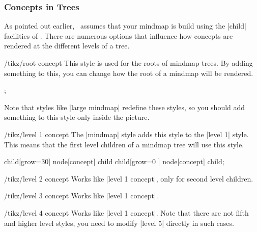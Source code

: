 \subsubsection{Concepts in Trees}

As pointed out earlier, \tikzname\ assumes that your mindmap is build
using the |child| facilities of \tikzname. There are numerous options
that influence how concepts are rendered at the different levels of a
tree. 

\begin{stylekey}{/tikz/root concept}
  This style is used for the roots of mindmap trees. By adding
  something to this, you can change how the root of a mindmap will be
  rendered.
\begin{codeexample}[]
\tikz
  [root concept/.append style={concept color=blue!80,minimum size=3.5cm},
   mindmap]
  ;
\end{codeexample}

  Note that styles like |large mindmap| redefine these styles, so you
  should add something to this style only inside the picture.
\end{stylekey}

\begin{stylekey}{/tikz/level 1 concept}
  The |mindmap| style adds this style to the |level 1| style. This
  means that the first level children of a mindmap tree will use this
  style. 
\begin{codeexample}[]
\tikz
  [root concept/.append style={concept color=blue!80},
   level 1 concept/.append style={concept color=red!50},
   mindmap]
    child[grow=30] {node[concept] {child}}
    child[grow=0 ] {node[concept] {child}};
\end{codeexample}
\end{stylekey}
\begin{stylekey}{/tikz/level 2 concept}
  Works like |level 1 concept|, only for second level children.
\end{stylekey}
\begin{stylekey}{/tikz/level 3 concept}
  Works like |level 1 concept|.
\end{stylekey}
\begin{stylekey}{/tikz/level 4 concept}
  Works like |level 1 concept|. Note that there are not fifth and
  higher level styles, you need to modify |level 5| directly in such
  cases. 
\end{stylekey}  

